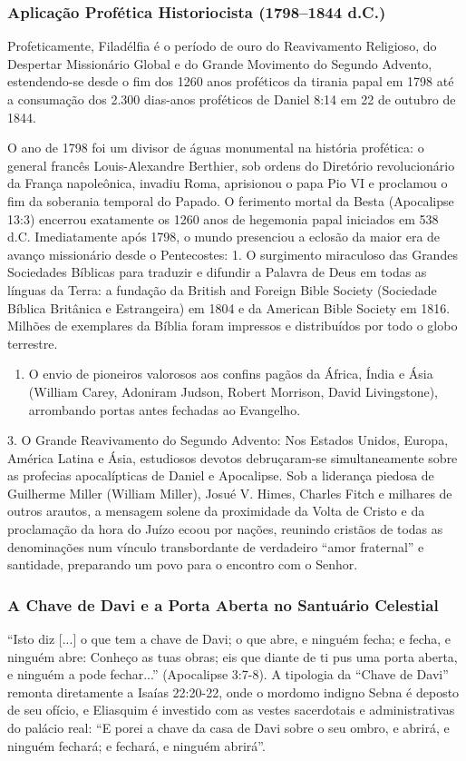 \documentclass[11pt,a4paper,openany]{book}
\begin{document}
\subsubsection*{Aplicação Profética Historiocista (1798–1844 d.C.)}
Profeticamente, Filadélfia é o período de ouro do Reavivamento Religioso, do Despertar Missionário Global e do Grande Movimento do Segundo Advento, estendendo-se desde o fim dos 1260 anos proféticos da tirania papal em 1798 até a consumação dos 2.300 dias-anos proféticos de Daniel 8:14 em 22 de outubro de 1844.

O ano de 1798 foi um divisor de águas monumental na história profética: o general francês Louis-Alexandre Berthier, sob ordens do Diretório revolucionário da França napoleônica, invadiu Roma, aprisionou o papa Pio VI e proclamou o fim da soberania temporal do Papado. O ferimento mortal da Besta (Apocalipse 13:3) encerrou exatamente os 1260 anos de hegemonia papal iniciados em 538 d.C. Imediatamente após 1798, o mundo presenciou a eclosão da maior era de avanço missionário desde o Pentecostes:
1. O surgimento miraculoso das Grandes Sociedades Bíblicas para traduzir e difundir a Palavra de Deus em todas as línguas da Terra: a fundação da British and Foreign Bible Society (Sociedade Bíblica Britânica e Estrangeira) em 1804 e da American Bible Society em 1816. Milhões de exemplares da Bíblia foram impressos e distribuídos por todo o globo terrestre.
\begin{enumerate}
  \item O envio de pioneiros valorosos aos confins pagãos da África, Índia e Ásia (William Carey, Adoniram Judson, Robert Morrison, David Livingstone), arrombando portas antes fechadas ao Evangelho.
\end{enumerate}

3. O Grande Reavivamento do Segundo Advento: Nos Estados Unidos, Europa, América Latina e Ásia, estudiosos devotos debruçaram-se simultaneamente sobre as profecias apocalípticas de Daniel e Apocalipse. Sob a liderança piedosa de Guilherme Miller (William Miller), Josué V. Himes, Charles Fitch e milhares de outros arautos, a mensagem solene da proximidade da Volta de Cristo e da proclamação da hora do Juízo ecoou por nações, reunindo cristãos de todas as denominações num vínculo transbordante de verdadeiro ``amor fraternal'' e santidade, preparando um povo para o encontro com o Senhor.


\subsubsection*{A Chave de Davi e a Porta Aberta no Santuário Celestial}
``Isto diz [...] o que tem a chave de Davi; o que abre, e ninguém fecha; e fecha, e ninguém abre: Conheço as tuas obras; eis que diante de ti pus uma porta aberta, e ninguém a pode fechar...'' (Apocalipse 3:7-8).
A tipologia da ``Chave de Davi'' remonta diretamente a Isaías 22:20-22, onde o mordomo indigno Sebna é deposto de seu ofício, e Eliasquim é investido com as vestes sacerdotais e administrativas do palácio real: ``E porei a chave da casa de Davi sobre o seu ombro, e abrirá, e ninguém fechará; e fechará, e ninguém abrirá''.
\end{document}
